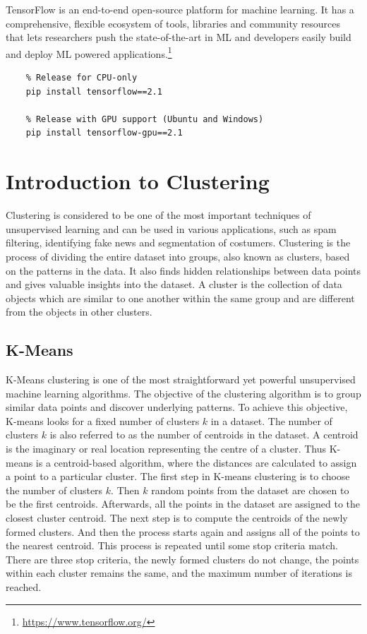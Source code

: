 TensorFlow is an end-to-end open-source platform for machine learning. It has a comprehensive, flexible ecosystem of tools, libraries and community resources that lets researchers push the state-of-the-art in \gls{ML} and developers easily build and deploy \gls{ML} powered applications.\footnote{\url{https://www.tensorflow.org/}}

\begin{verbatim}
    % Release for CPU-only
    pip install tensorflow==2.1
    
    % Release with GPU support (Ubuntu and Windows)
    pip install tensorflow-gpu==2.1 
\end{verbatim}

\section{Introduction to Clustering}
\label{sec:Intro-Clustering}

Clustering is considered to be one of the most important techniques of unsupervised learning and can be used in various applications, such as spam filtering, identifying fake news and segmentation of costumers. 
\newline
\newline
Clustering is the process of dividing the entire dataset into groups, also known as clusters, based on the patterns in the data. It also finds hidden relationships between data points and gives valuable insights into the dataset. A cluster is the collection of data objects which are similar to one another within the same group and are different from the objects in other clusters.

\subsection{K-Means}
\label{sub:K-Means}

K-Means clustering is one of the most straightforward yet powerful unsupervised machine learning algorithms. The objective of the clustering algorithm is to group similar data points and discover underlying patterns. To achieve this objective, K-means looks for a fixed number of clusters $k$ in a dataset. The number of clusters $k$ is also referred to as the number of centroids in the dataset. A centroid is the imaginary or real location representing the centre of a cluster. Thus K-means is a centroid-based algorithm, where the distances are calculated to assign a point to a particular cluster.
\newline
\newline
The first step in K-means clustering is to choose the number of clusters $k$. Then $k$ random points from the dataset are chosen to be the first centroids. Afterwards, all the points in the dataset are assigned to the closest cluster centroid. The next step is to compute the centroids of the newly formed clusters. And then the process starts again and assigns all of the points to the nearest centroid. This process is repeated until some stop criteria match. There are three stop criteria, the newly formed clusters do not change, the points within each cluster remains the same, and the maximum number of iterations is reached.

